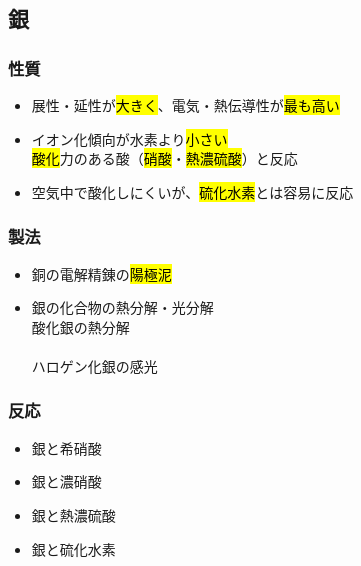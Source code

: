 \subsection{銀}
\subsubsection{性質}
\begin{itemize}
      \item 展性・延性が\hl{大きく}、電気・熱伝導性が\hl{最も高い}
      \item イオン化傾向が水素より\hl{小さい}\\
            \hl{酸化}力のある酸（\hl{硝酸}・\hl{熱濃硫酸}）と反応
      \item 空気中で酸化しにくいが、\hl{硫化水素}とは容易に反応
\end{itemize}
\subsubsection{製法}
\begin{itemize}
      \item 銅の電解精錬の\hl{陽極泥} \K
      \item 銀の化合物の熱分解・光分解\\
            酸化銀の熱分解\\
            \\
            ハロゲン化銀の感光\\
\end{itemize}
\subsubsection{反応}
\begin{itemize}
      \item 銀と希硝酸\\
      \item 銀と濃硝酸\\
      \item 銀と熱濃硫酸\\
      \item 銀と硫化水素\\
\end{itemize}
